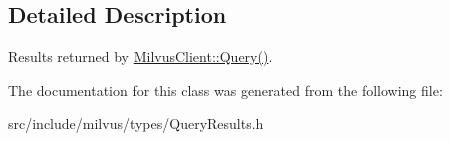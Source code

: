 \subsection{Detailed Description}
Results returned by \hyperlink{classmilvus_1_1_milvus_client_a2c27e3b681313329ccf491867d717182}{Milvus\+Client\+::\+Query()}. 

The documentation for this class was generated from the following file\+:\begin{DoxyCompactItemize}
\item 
src/include/milvus/types/Query\+Results.\+h\end{DoxyCompactItemize}
